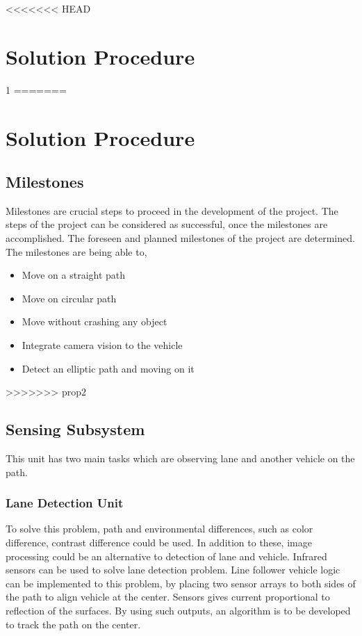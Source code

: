 \documentclass[a4paper,12pt]{article}
\begin{document}
<<<<<<< HEAD
\section{Solution Procedure}1
=======
\section{Solution Procedure}

\subsection{Milestones}
	Milestones are crucial steps to proceed in the development of the project. The steps of the project can be considered as successful, once the milestones are accomplished. The foreseen and planned milestones of the project are determined. The milestones are being able to,
	\begin{itemize}
		\item Move on a straight path  \vspace{-.2cm}
		\item Move on circular path \vspace{-.2cm}
		\item Move without crashing any object \vspace{-.2cm}
		\item Integrate camera vision to the vehicle  \vspace{-.2cm}
		\item Detect an elliptic path and moving on it \vspace{-.2cm}	
	\end{itemize}

	 
	
>>>>>>> prop2
\subsection{Sensing Subsystem}
This unit has two main tasks which are observing lane and another vehicle on the path. 
\subsubsection{Lane Detection Unit}
To solve this problem, path and environmental differences, such as color difference, contrast difference could be used. In addition to these, image processing could be an alternative to detection of lane and vehicle. 
Infrared sensors can be used to solve lane detection problem. Line follower vehicle logic can be implemented to this problem, by placing two sensor arrays to both sides of the path to align vehicle at the center. Sensors gives current proportional to reflection of the surfaces. By using such outputs, an algorithm is to be developed to track the path on the center. 
\end{document}
